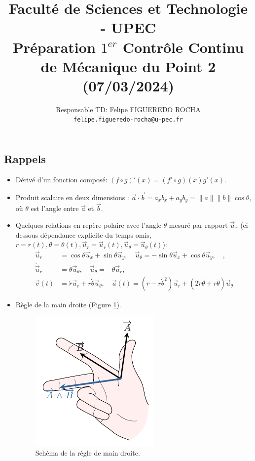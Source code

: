 \documentclass[french,10pt]{article}
\title{ \large
Faculté de Sciences et Technologie - UPEC \\
Préparation $1^{er}$ Contrôle Continu de Mécanique du Point 2 (07/03/2024)\\ }
\author{Responsable TD: Felipe FIGUEREDO ROCHA \\ \texttt{felipe.figueredo-rocha@u-pec.fr}}
\date{}
\begin{document}
	
	\maketitle
	\subsection*{Rappels}
	\begin{itemize}
		\item Dérivé d'un fonction composé: $(f \circ g)'(x) = (f' \circ g)(x) g'(x)$.
		\item Produit scalaire en deux dimensions : $\vec{a} \cdot \vec{b} = a_x b_x + a_y b_y = \|a\| \|b\| \cos{\theta}$, où $\theta$ est l'angle entre $\vec{a}$ et $\vec{b}$.
		\item Quelques relations en repère polaire avec l'angle $\theta$ mesuré par rapport $\Vec{u}_x$ (ci-dessous dépendance explicite du temps omis, $r=r(t) , \theta=\theta(t), \Vec{u}_r = \Vec{u}_r(t), \Vec{u}_{\theta} = \Vec{u}_{\theta}(t)$):
		\begin{align*}
			\Vec{u}_r &= \cos{\theta} \Vec{u}_x + \sin{\theta} \Vec{u}_y, \quad \Vec{u}_{\theta} = -\sin{\theta} \Vec{u}_x + \cos{\theta} \Vec{u}_y, \quad, \\
			\dot{\Vec{u}}_r &= \dot{\theta} \Vec{u}_{\theta}, \quad  \dot{\Vec{u}}_{\theta} = -\dot{\theta} \Vec{u}_{r}, \\
			\Vec{v}(t) &= \dot{r} \Vec{u}_r + r \dot{\theta} \Vec{u}_{\theta}, \quad
			\Vec{a}(t) = (\ddot{r} - r\dot{\theta}^2) \Vec{u}_r + (2 \dot{r} \dot{\theta} + r \ddot{\theta}) \Vec{u}_{\theta}
		\end{align*}
	
	\item Règle de la main droite (Figure \ref{fig:regledelamaindroite}).
	\begin{figure}[h!]
		\centering
		\includegraphics[width=0.25\linewidth]{regle_de_la_main_droite}
		\caption{Schéma de la règle de main droite.}
		\label{fig:regledelamaindroite}
	\end{figure}
	 
	\end{itemize}
\end{document}
